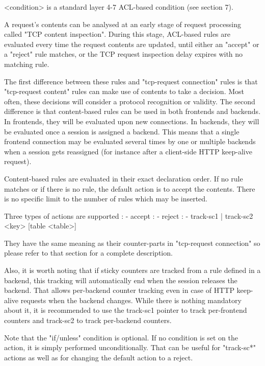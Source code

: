     <condition> is a standard layer 4-7 ACL-based condition (see section 7).

  A request's contents can be analysed at an early stage of request processing
  called "TCP content inspection". During this stage, ACL-based rules are
  evaluated every time the request contents are updated, until either an
  "accept" or a "reject" rule matches, or the TCP request inspection delay
  expires with no matching rule.

  The first difference between these rules and "tcp-request connection" rules
  is that "tcp-request content" rules can make use of contents to take a
  decision. Most often, these decisions will consider a protocol recognition or
  validity. The second difference is that content-based rules can be used in
  both frontends and backends. In frontends, they will be evaluated upon new
  connections. In backends, they will be evaluated once a session is assigned
  a backend. This means that a single frontend connection may be evaluated
  several times by one or multiple backends when a session gets reassigned
  (for instance after a client-side HTTP keep-alive request).

  Content-based rules are evaluated in their exact declaration order. If no
  rule matches or if there is no rule, the default action is to accept the
  contents. There is no specific limit to the number of rules which may be
  inserted.

  Three types of actions are supported :
    - accept :
    - reject :
    - { track-sc1 | track-sc2 } <key> [table <table>]

  They have the same meaning as their counter-parts in "tcp-request connection"
  so please refer to that section for a complete description.

  Also, it is worth noting that if sticky counters are tracked from a rule
  defined in a backend, this tracking will automatically end when the session
  releases the backend. That allows per-backend counter tracking even in case
  of HTTP keep-alive requests when the backend changes. While there is nothing
  mandatory about it, it is recommended to use the track-sc1 pointer to track
  per-frontend counters and track-sc2 to track per-backend counters.

  Note that the "if/unless" condition is optional. If no condition is set on
  the action, it is simply performed unconditionally. That can be useful for
  "track-sc*" actions as well as for changing the default action to a reject.

